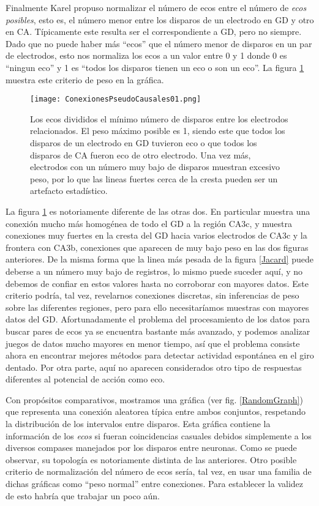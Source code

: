 \documentclass{article}
\begin{document}
Finalmente Karel propuso normalizar el número de ecos entre el número
de \emph{ecos posibles}, esto es, el número menor entre los disparos
de un electrodo en GD y otro en CA. Típicamente este resulta ser
el correspondiente a GD, pero no siempre. Dado que no puede haber más 
``ecos'' que el número menor de disparos en un par de electrodos, 
esto nos normaliza los ecos a un valor entre 0 y 1 donde 0 es
``ningun eco'' y 1 es ``todos los disparos tienen un eco o son un eco''.
La figura \ref{MinimalCrit} muestra este criterio de peso en la
gráfica.

\begin{figure}[h]
\centering
\texttt{[image: ConexionesPseudoCausales01.png]}
\caption{ Los ecos divididos el mínimo número de disparos
 entre los electrodos relacionados. El peso máximo posible es
1, siendo este que todos los disparos de un electrodo en  GD 
tuvieron eco o que todos
los disparos de CA fueron eco de otro electrodo. Una vez más,
electrodos con un número muy bajo de disparos muestran excesivo
peso, por lo que las lineas fuertes cerca de la cresta pueden
ser un artefacto estadístico.
}\label{MinimalCrit}
\end{figure}

La figura \ref{MinimalCrit}
es notoriamente diferente de las otras dos. En particular
muestra una conexión mucho más homogénea de todo el GD a la 
región CA3c, y muestra conexiones muy fuertes en la cresta del GD 
hacia varios electrodos de CA3c y la frontera con CA3b, conexiones
que aparecen de muy bajo peso en las dos figuras anteriores.
De la misma forma que la linea más pesada de la figura \ref{Jacard}
puede deberse a un número muy bajo de registros, lo mismo puede
suceder aquí, y no debemos de confiar en estos valores hasta no 
corroborar con mayores datos. Este criterio podría, tal vez, 
revelarnos conexiones discretas, sin inferencias de peso sobre 
las diferentes regiones, pero para ello necesitaríamos muestras
con mayores datos del GD. Afortunadamente el problema del procesamiento
de los datos para buscar pares de ecos ya se encuentra bastante 
más avanzado, y podemos analizar juegos de datos mucho mayores en menor
tiempo, así que el problema consiste ahora en encontrar mejores
métodos para detectar actividad espontánea en el giro dentado. Por
otra parte, aquí no aparecen considerados otro tipo de respuestas
diferentes al potencial de acción como eco. 

Con propósitos comparativos, mostramos una gráfica 
(ver fig. \ref{RandomGraph})
que representa
una conexión aleatorea típica entre ambos conjuntos, respetando
la distribución de los intervalos entre disparos. Esta gráfica
contiene la información de los \emph{ecos} si fueran 
coincidencias casuales debidos simplemente a los diversos compases
manejados por los disparos entre neuronas. Como se puede observar,
su topología es notoriamente distinta de las anteriores. 
Otro posible criterio de normalización del número de ecos sería,
tal vez, en usar una familia de dichas gráficas como ``peso normal''
entre conexiones. Para establecer la validez de esto habría que trabajar un
poco aún. 
\end{document}

